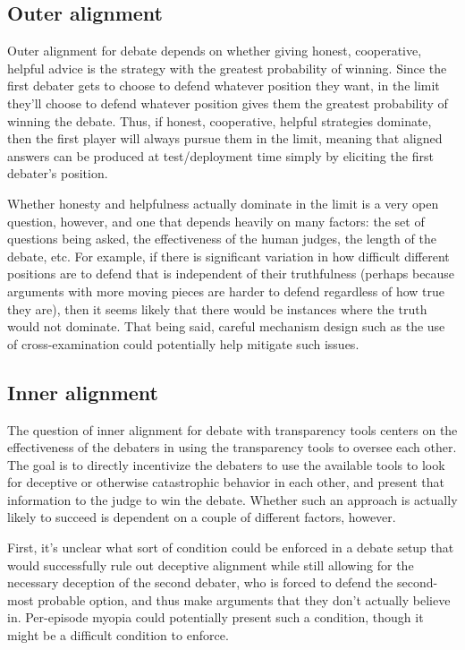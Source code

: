 \documentclass[
  onecolumn,
  natbib,
]{miri-tech-article}
\begin{document}
\vspace{2mm}

\subsection{Outer alignment} Outer alignment for debate depends on whether giving honest, cooperative, helpful advice is the strategy with the greatest probability of winning. Since the first debater gets to choose to defend whatever position they want, in the limit they'll choose to defend whatever position gives them the greatest probability of winning the debate. Thus, if honest, cooperative, helpful strategies dominate, then the first player will always pursue them in the limit, meaning that aligned answers can be produced at test/deployment time simply by eliciting the first debater's position. 

Whether honesty and helpfulness actually dominate in the limit is a very open question, however, and one that depends heavily on many factors: the set of questions being asked, the effectiveness of the human judges, the length of the debate, etc. For example, if there is significant variation in how difficult different positions are to defend that is independent of their truthfulness (perhaps because arguments with more moving pieces are harder to defend regardless of how true they are), then it seems likely that there would be instances where the truth would not dominate. That being said, careful mechanism design such as the use of cross-examination could potentially help mitigate such issues.

\subsection{Inner alignment} The question of inner alignment for debate with transparency tools centers on the effectiveness of the debaters in using the transparency tools to oversee each other. The goal is to directly incentivize the debaters to use the available tools to look for deceptive or otherwise catastrophic behavior in each other, and present that information to the judge to win the debate. Whether such an approach is actually likely to succeed is dependent on a couple of different factors, however.

First, it's unclear what sort of condition could be enforced in a debate setup that would successfully rule out deceptive alignment while still allowing for the necessary deception of the second debater, who is forced to defend the second-most probable option, and thus make arguments that they don't actually believe in. Per-episode myopia could potentially present such a condition, though it might be a difficult condition to enforce.
\end{document}
